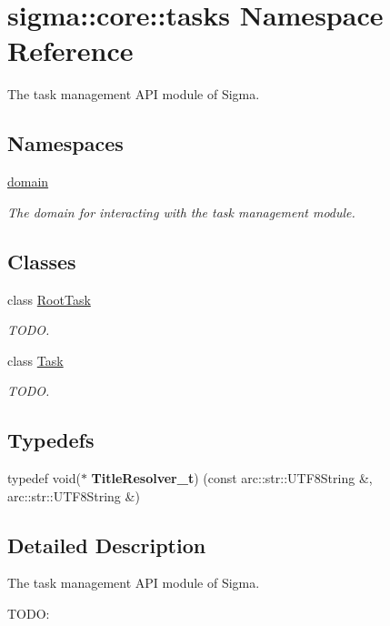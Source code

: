 \hypertarget{namespacesigma_1_1core_1_1tasks}{}\section{sigma\+:\+:core\+:\+:tasks Namespace Reference}
\label{namespacesigma_1_1core_1_1tasks}


The task management A\+P\+I module of Sigma.  


\subsection*{Namespaces}
\begin{DoxyCompactItemize}
\item 
 \hyperlink{namespacesigma_1_1core_1_1tasks_1_1domain}{domain}
\begin{DoxyCompactList}\small\item\em The domain for interacting with the task management module. \end{DoxyCompactList}\end{DoxyCompactItemize}
\subsection*{Classes}
\begin{DoxyCompactItemize}
\item 
class \hyperlink{classsigma_1_1core_1_1tasks_1_1_root_task}{Root\+Task}
\begin{DoxyCompactList}\small\item\em T\+O\+D\+O. \end{DoxyCompactList}\item 
class \hyperlink{classsigma_1_1core_1_1tasks_1_1_task}{Task}
\begin{DoxyCompactList}\small\item\em T\+O\+D\+O. \end{DoxyCompactList}\end{DoxyCompactItemize}
\subsection*{Typedefs}
\begin{DoxyCompactItemize}
\item 
\hypertarget{namespacesigma_1_1core_1_1tasks_a5aac09f438f0897463ea4ee305b6fdf8}{}typedef void($\ast$ {\bfseries Title\+Resolver\+\_\+t}) (const arc\+::str\+::\+U\+T\+F8\+String \&, arc\+::str\+::\+U\+T\+F8\+String \&)\label{namespacesigma_1_1core_1_1tasks_a5aac09f438f0897463ea4ee305b6fdf8}

\end{DoxyCompactItemize}


\subsection{Detailed Description}
The task management A\+P\+I module of Sigma. 

T\+O\+D\+O\+: 